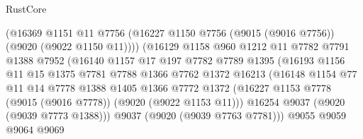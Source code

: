 \begin{lexlean}{RustCore}
\begin{coremodule}
                              (@16369
                                @1151
                                @11
                                @7756
                                (@16227
                                  @1150
                                  @7756
                                  (@9015 (@9016 @7756))
                                  (@9020 (@9022 @1150 @11))))
                              (@16129
                                @1158
                                @960
                                @1212
                                @11
                                @7782
                                @7791
                                @1388
                                @7952
                                (@16140
                                  @1157
                                  @17
                                  @197
                                  @7782
                                  @7789
                                  @1395
                                  (@16193
                                    @1156
                                    @11
                                    @15
                                    @1375
                                    @7781
                                    @7788
                                    @1366
                                    @7762
                                    @1372
                                    @16213
                                    (@16148
                                      @1154
                                      @77
                                      @11
                                      @14
                                      @7778
                                      @1388
                                      @1405
                                      @1366
                                      @7772
                                      @1372
                                      (@16227
                                        @1153
                                        @7778
                                        (@9015 (@9016 @7778))
                                        (@9020 (@9022 @1153 @11)))
                                      @16254
                                      @9037
                                      (@9020 (@9039 @7773 @1388)))
                                    @9037
                                    (@9020 (@9039 @7763 @7781)))
                                  @9055
                                  @9059
                                  @9064
                                  @9069

\end{coremodule}
\end{lexlean}
